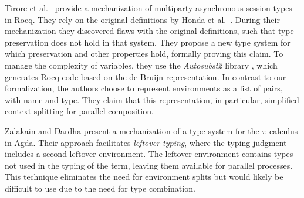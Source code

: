 Tirore et al.~\cite{tiroreMultipartyAsynchronousSession2025} provide a mechanization of multiparty asynchronous session types in Rocq.
They rely on the original definitions by Honda et al.~\cite{hondaMultipartyAsynchronousSession2016}.
During their mechanization they discovered flaws with the original definitions, such that type preservation does not hold in that system.
They propose a new type system for which preservation and other properties hold, formally proving this claim.
To manage the complexity of variables, they use the \emph{Autosubst2} library \cite{starkMechanisingSyntaxBinders2019}, which generates Rocq code based on the de Bruijn representation.
In contrast to our formalization, the authors choose to represent environments as a list of pairs, with name and type.
They claim that this representation, in particular, simplified context splitting for parallel composition.

Zalakain and Dardha \cite{zalakainLeftoversMechanisationAgda2021} present a mechanization of a type system for the $\pi$-calculus in Agda.
Their approach facilitates \emph{leftover typing}, where the typing judgment includes a second leftover environment.
The leftover environment contains types not used in the typing of the term, leaving them available for parallel processes.
This technique eliminates the need for environment splits but would likely be
difficult to use due to the need for type combination.
